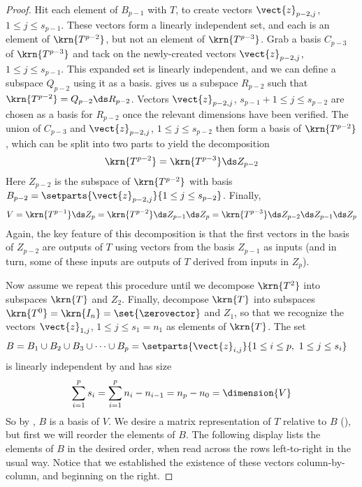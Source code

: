 \begin{proof}
%
Hit each element of $B_{p-1}$ with $T$, to create vectors $\vect{z}_{p-2,j}$, $1\leq j\leq s_{p-1}$.  These vectors form a linearly independent set, and each is an element of $\krn{T^{p-2}}$, but not an element of $\krn{T^{p-3}}$.  Grab a basis $C_{p-3}$ of $\krn{T^{p-3}}$ and tack on the newly-created vectors $\vect{z}_{p-2,j}$, $1\leq j\leq s_{p-1}$.  This expanded set is linearly independent, and we can define a subspace $Q_{p-2}$ using it as a basis.   gives us a subspace $R_{p-2}$ such that $\krn{T^{p-2}}=Q_{p-2}\ds R_{p-2}$.  Vectors $\vect{z}_{p-2,j}$, $s_{p-1}+1\leq j\leq s_{p-2}$ are chosen as a basis for $R_{p-2}$ once the relevant dimensions have been verified.  The union of $C_{p-3}$ and $\vect{z}_{p-2,j}$, $1\leq j\leq s_{p-2}$ then form a basis of $\krn{T^{p-2}}$, which can be split into two parts to yield the decomposition
%
\begin{align*}
\krn{T^{p-2}}=\krn{T^{p-3}}\ds Z_{p-2}
\end{align*}
%
Here $Z_{p-2}$ is the subspace of $\krn{T^{p-2}}$ with basis $B_{p-2}=\setparts{\vect{z}_{p-2,j}}{1\leq j\leq s_{p-2}}$.  Finally,
%
\begin{align*}
V=\krn{T^{p-1}}\ds Z_{p}=\krn{T^{p-2}}\ds Z_{p-1}\ds Z_{p}=\krn{T^{p-3}}\ds Z_{p-2}\ds Z_{p-1}\ds Z_{p}
\end{align*}
%
Again, the key feature of this decomposition is that the first vectors in the basis of $Z_{p-2}$ are outputs of $T$ using vectors from the basis $Z_{p-1}$ as inputs (and in turn, some of these inputs are outputs of $T$ derived from inputs in $Z_p$).\par
%
Now assume we repeat this procedure until we decompose $\krn{T^{2}}$ into subspaces $\krn{T}$ and $Z_2$.  Finally, decompose $\krn{T}$ into subspaces $\krn{T^0}=\krn{I_n}=\set{\zerovector}$ and $Z_1$, so that we recognize the vectors $\vect{z}_{1,j}$, $1\leq j\leq s_1=n_1$ as elements of $\krn{T}$.  The set
%
\begin{align*}
B
&=B_1\cup B_2\cup B_3\cup\cdots\cup B_p
=\setparts{\vect{z}_{i,j}}{1\leq i\leq p,\ 1\leq j\leq s_i}
\end{align*}
%
is linearly independent by  and has size
%
\begin{align*}
\sum_{i=1}^{p}s_i=\sum_{i=1}^{p}n_i-n_{i-1}=n_p-n_0=\dimension{V}
\end{align*}
%
So by , $B$ is a basis of $V$.  We desire a matrix representation of $T$ relative to $B$ (), but first we will reorder the elements of $B$.  The following display lists the elements of $B$ in the desired order, when read across the rows left-to-right in the usual way.  Notice that we established the existence of these vectors column-by-column, and beginning on the right.

\end{proof}
